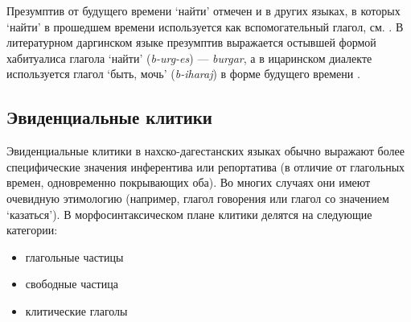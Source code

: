 Презумптив от будущего времени `найти' отмечен и в других языках, в которых `найти' в прошедшем времени используется как вспомогательный глагол, см. \citep{danielmaisak2018}.
В литературном даргинском языке презумптив выражается остывшей формой хабитуалиса глагола `найти' (\textit{b-urg-es}) --- \textit{burgar}, а в ицаринском диалекте используется глагол `быть, мочь' (\textit{b-iharaj}) в форме будущего времени \citep{mutalov2002}.

\subsection{Эвиденциальные клитики} \label{sec:clitics}

Эвиденциальные клитики в нахско-дагестанских языках обычно выражают более специфические значения инферентива или репортатива (в отличие от глагольных времен, одновременно покрывающих оба). Во многих случаях они имеют очевидную этимологию (например, глагол говорения или глагол со значением `казаться'). В морфосинтаксическом плане клитики делятся на следующие категории:

\begin{itemize}
    \item глагольные частицы
    \item свободные частица
    \item клитические глаголы
\end{itemize}

